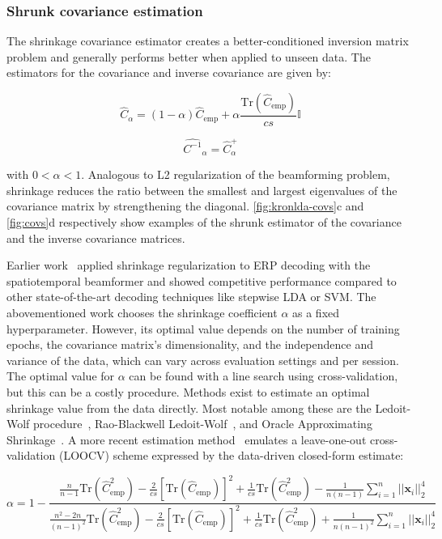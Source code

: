 \begin{refsection}
	\subsubsection{Shrunk covariance estimation}
	\label{sec:shrunk_covariance}
	The shrinkage covariance estimator creates a better-conditioned inversion matrix problem and generally performs better when applied to unseen data.
	The estimators for the covariance and inverse covariance are given by:

	\begin{equation}
		\hat{C}_\alpha =
		(1-\alpha) \hat{C}_\text{emp}
		+ \alpha\frac{\text{Tr}(\hat{C}_\text{emp})}{cs}\mathbb{I}
		\label{eq:shrinkage}
	\end{equation}


	\begin{equation}
		\widehat{C^{-1}}_\alpha =
		\hat{C}^+_\alpha
		\label{eq:shrinkage_inverse}
	\end{equation}

	with $0<\alpha<1$.
	Analogous to L2 regularization of the beamforming problem,
	shrinkage reduces the ratio between the smallest and largest eigenvalues
	of the covariance matrix by strengthening the diagonal.
	\autoref{fig:kronlda-covs}c and \autoref{fig:covs}d respectively show examples of the
	shrunk estimator of the covariance and the inverse covariance matrices.

	Earlier work~\cite{Libert2021} applied shrinkage regularization to ERP
	decoding with the spatiotemporal beamformer and showed competitive performance
	compared to other state-of-the-art decoding techniques like stepwise LDA or SVM.
	The abovementioned work chooses the shrinkage coefficient $\alpha$ as a fixed hyperparameter.
	However, its optimal value depends on the number of training epochs, the
	covariance matrix's dimensionality, and the independence and variance of the
	data, which can vary across evaluation settings and per session.
	The optimal value for $\alpha$ can be found with a line search using cross-validation, but this can be a costly procedure.
	Methods exist to estimate an optimal shrinkage value from the data directly.
	Most notable among these are the Ledoit-Wolf procedure~\cite{Ledoit2004},
	Rao-Blackwell Ledoit-Wolf~\cite{Chen2010shrinkage}, and Oracle Approximating Shrinkage~\cite{Chen2010shrinkage}.
	A more recent estimation method~\cite{Tong2018} emulates a leave-one-out
	cross-validation (LOOCV) scheme expressed by the data-driven closed-form
	estimate:

	\begin{equation}
		\alpha =
		1-\frac{
			\frac{n}{n-1}\text{Tr}(\hat{C}_\text{emp}^2)
			- \frac{2}{cs}\left[\text{Tr}(\hat{C}_\text{emp})\right]^2
			+ \frac{1}{cs}\text{Tr}(\hat{C}_\text{emp}^2)
			- \frac{1}{n(n-1)}\sum_{i=1}^n||\mathbf{x}_i||_2^4
		}
		{
			\frac{n^2 -2n}{(n-1)^2}\text{Tr}(\hat{C}_\text{emp}^2)
			- \frac{2}{cs}\left[\text{Tr}(\hat{C}_\text{emp})\right]^2
			+ \frac{1}{cs}\text{Tr}(\hat{C}_\text{emp}^2)
			+ \frac{1}{n(n-1)^2}\sum_{i=1}^n||\mathbf{x}_i||_2^4
		}
		\label{eq:loocv}
	\end{equation}


\end{refsection}

